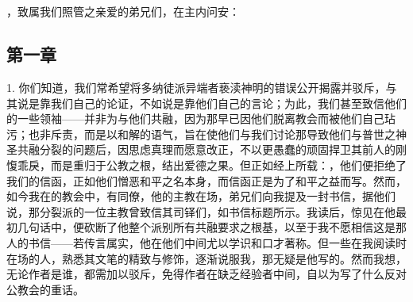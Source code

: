 
\section{}

\par

\par

，致属我们照管之亲爱的弟兄们，在主内问安：\par


\subsection{第一章}

1. 你们知道，我们常希望将多纳徒派异端者亵渎神明的错误公开揭露并驳斥，与其说是靠我们自己的论证，不如说是靠他们自己的言论；为此，我们甚至致信他们的一些领袖——并非为与他们共融，因为那早已因他们脱离教会而被他们自己玷污；也非斥责，而是以和解的语气，旨在使他们与我们讨论那导致他们与普世之神圣共融分裂的问题后，因思虑真理而愿意改正，不以更愚蠢的顽固捍卫其前人的刚愎乖戾，而是重归于公教之根，结出爱德之果。但正如经上所载：，他们便拒绝了我们的信函，正如他们憎恶和平之名本身，而信函正是为了和平之益而写。然而，如今我在的教会中，有同僚，他的主教在场，弟兄们向我提及一封书信，据他们说，那分裂派的一位主教曾致信其司铎们，如书信标题所示。我读后，惊见在他最初几句话中，便砍断了他整个派别所有共融要求之根基，以至于我不愿相信这是那人的书信——若传言属实，他在他们中间尤以学识和口才著称。但一些在我阅读时在场的人，熟悉其文笔的精致与修饰，逐渐说服我，那无疑是他写的。然而我想，无论作者是谁，都需加以驳斥，免得作者在缺乏经验者中间，自以为写了什么反对公教会的重话。\par

